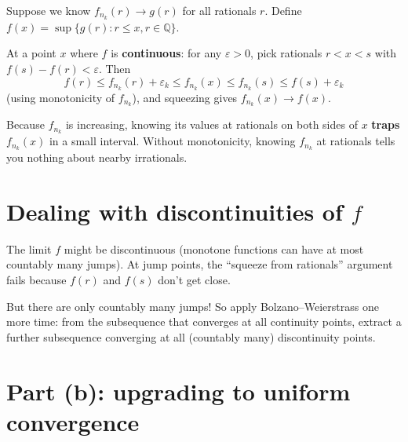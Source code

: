 \documentclass[12pt]{article}
\begin{document}
Suppose we know $f_{n_k}(r) \to g(r)$ for all rationals $r$. Define $f(x) = \sup\{g(r) : r \leq x, r \in \mathbb{Q}\}$.

At a point $x$ where $f$ is \textbf{continuous}: for any $\varepsilon > 0$, pick rationals $r < x < s$ with $f(s) - f(r) < \varepsilon$. Then
$$
f(r) \leq f_{n_k}(r) + \varepsilon_k \leq f_{n_k}(x) \leq f_{n_k}(s) \leq f(s) + \varepsilon_k
$$
(using monotonicity of $f_{n_k}$), and squeezing gives $f_{n_k}(x) \to f(x)$.

\begin{center}
\end{center}

Because $f_{n_k}$ is increasing, knowing its values at rationals on both sides of $x$ \textbf{traps} $f_{n_k}(x)$ in a small interval. Without monotonicity, knowing $f_{n_k}$ at rationals tells you nothing about nearby irrationals.

\section*{Dealing with discontinuities of $f$}

The limit $f$ might be discontinuous (monotone functions can have at most countably many jumps). At jump points, the ``squeeze from rationals'' argument fails because $f(r)$ and $f(s)$ don't get close.

But there are only countably many jumps! So apply Bolzano--Weierstrass one more time: from the subsequence that converges at all continuity points, extract a further subsequence converging at all (countably many) discontinuity points.

\section*{Part (b): upgrading to uniform convergence}
\end{document}
